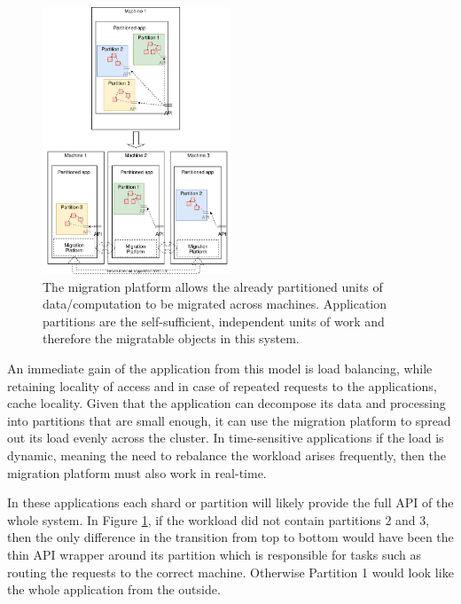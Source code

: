\begin{figure}[t]
\centering

\includegraphics[width=0.5\textwidth]{design-goals-pluggable.drawio}
\caption{
    The migration platform allows the already partitioned units of
    data/computation to be migrated across machines. Application partitions
    are the self-sufficient, independent units of work and therefore the
    migratable objects in this system.
}
\label{fig:designgoalspluggable}
\end{figure}

An immediate gain of the application from this model is load balancing,
while retaining locality of access and in case of repeated requests to
the applications, cache locality.
Given that the application can decompose its data and processing into
partitions that are small enough, it can use the migration platform to
spread
out its load evenly across the cluster. In time-sensitive applications
if the load is dynamic,
meaning the need to rebalance the workload arises frequently,
then the migration platform must also work in real-time.

In these applications each shard or partition will likely provide the
full API of the whole system. In Figure \ref{fig:designgoalspluggable},
if the workload did not contain partitions 2 and 3, then the only
    difference in the transition from top to bottom would have been the
    thin API wrapper around its partition which is responsible for tasks
    such as routing the requests to the correct machine. Otherwise
    Partition 1 would look like the whole application from the outside.

